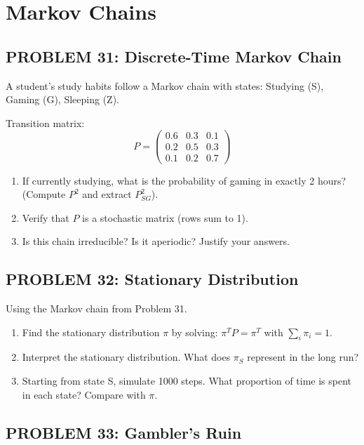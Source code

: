 \documentclass[12pt]{article}
\begin{document}
\newpage
\section*{Markov Chains}

\subsection*{PROBLEM 31: Discrete-Time Markov Chain}

A student's study habits follow a Markov chain with states: Studying (S), Gaming (G), Sleeping (Z).

Transition matrix:
\[
P = \begin{pmatrix}
0.6 & 0.3 & 0.1 \\
0.2 & 0.5 & 0.3 \\
0.1 & 0.2 & 0.7
\end{pmatrix}
\]

\begin{enumerate}
\item[(a)] If currently studying, what is the probability of gaming in exactly 2 hours? (Compute \(P^2\) and extract \(P^2_{SG}\)).
\item[(b)] Verify that \(P\) is a stochastic matrix (rows sum to 1).
\item[(c)] Is this chain irreducible? Is it aperiodic? Justify your answers.
\end{enumerate}

\subsection*{PROBLEM 32: Stationary Distribution}

Using the Markov chain from Problem 31.

\begin{enumerate}
\item[(a)] Find the stationary distribution \(\pi\) by solving: \(\pi^T P = \pi^T\) with \(\sum_i \pi_i = 1\).
\item[(b)] Interpret the stationary distribution. What does \(\pi_S\) represent in the long run?
\item[(c)] Starting from state S, simulate 1000 steps. What proportion of time is spent in each state? Compare with \(\pi\).
\end{enumerate}

\subsection*{PROBLEM 33: Gambler's Ruin}
\end{document}
